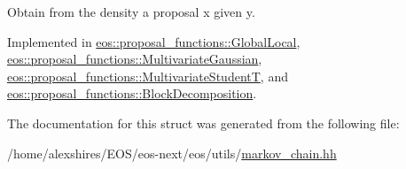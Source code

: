 Obtain from the density a proposal x given y. 

Implemented in \hyperlink{classeos_1_1proposal__functions_1_1GlobalLocal_a600d45aa7174be9fb264a938de61a568}{eos::proposal\_\-functions::GlobalLocal}, \hyperlink{classeos_1_1proposal__functions_1_1MultivariateGaussian_a4f451b8dc78b681eee4bda462217fb77}{eos::proposal\_\-functions::MultivariateGaussian}, \hyperlink{classeos_1_1proposal__functions_1_1MultivariateStudentT_ad7c59db9bc93f0fb4b3204b8f272ba6c}{eos::proposal\_\-functions::MultivariateStudentT}, and \hyperlink{classeos_1_1proposal__functions_1_1BlockDecomposition_a5b0a6e997f1c78d2557f2a742c4d3813}{eos::proposal\_\-functions::BlockDecomposition}.

The documentation for this struct was generated from the following file:\begin{DoxyCompactItemize}
\item 
/home/alexshires/EOS/eos-\/next/eos/utils/\hyperlink{markov__chain_8hh}{markov\_\-chain.hh}\end{DoxyCompactItemize}
